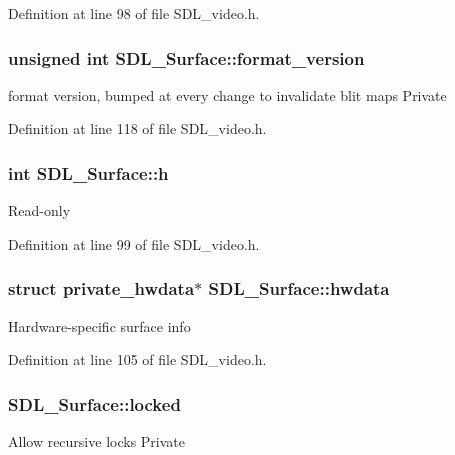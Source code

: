 Definition at line 98 of file S\+D\+L\+\_\+video.\+h.

\hypertarget{struct_s_d_l___surface_a71e84e52b2faf69be9739f97b248342a}{}
\subsubsection[{format\+\_\+version}]{\setlength{\rightskip}{0pt plus 5cm}unsigned int S\+D\+L\+\_\+\+Surface\+::format\+\_\+version}\label{struct_s_d_l___surface_a71e84e52b2faf69be9739f97b248342a}
format version, bumped at every change to invalidate blit maps Private 

Definition at line 118 of file S\+D\+L\+\_\+video.\+h.

\hypertarget{struct_s_d_l___surface_af33bcf87a1f5e10a99b3c7e8626b38c8}{}
\subsubsection[{h}]{\setlength{\rightskip}{0pt plus 5cm}int S\+D\+L\+\_\+\+Surface\+::h}\label{struct_s_d_l___surface_af33bcf87a1f5e10a99b3c7e8626b38c8}
Read-\/only 

Definition at line 99 of file S\+D\+L\+\_\+video.\+h.

\hypertarget{struct_s_d_l___surface_a2d3ce688b6cfb72875f2411ea0560f18}{}
\subsubsection[{hwdata}]{\setlength{\rightskip}{0pt plus 5cm}struct private\+\_\+hwdata$\ast$ S\+D\+L\+\_\+\+Surface\+::hwdata}\label{struct_s_d_l___surface_a2d3ce688b6cfb72875f2411ea0560f18}
Hardware-\/specific surface info 

Definition at line 105 of file S\+D\+L\+\_\+video.\+h.

\hypertarget{struct_s_d_l___surface_ae807b7e4f4174d56e6cf40df12c8cefe}{}
\subsubsection[{locked}]{ S\+D\+L\+\_\+\+Surface\+::locked}\label{struct_s_d_l___surface_ae807b7e4f4174d56e6cf40df12c8cefe}
Allow recursive locks Private 

